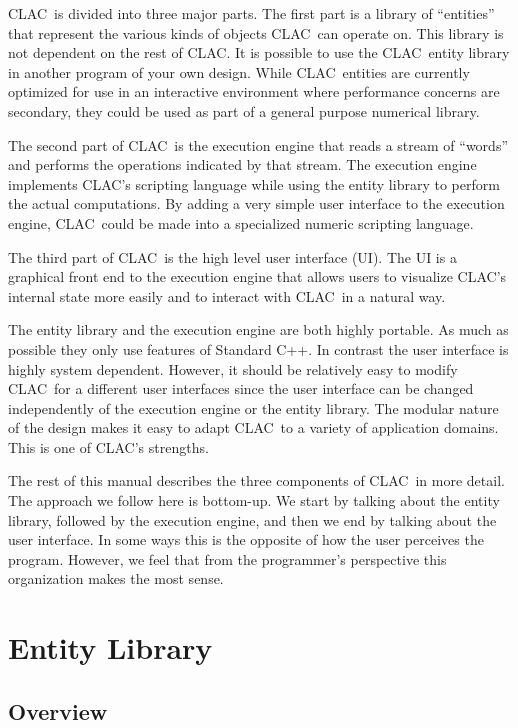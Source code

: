 \documentclass{report}
\newcommand{\CLAC}{CLAC}
\begin{document}
\CLAC\ is divided into three major parts. The first part is a library of ``entities'' that represent the various kinds of objects \CLAC\ can operate on. This library is not dependent on the rest of \CLAC. It is possible to use the \CLAC\ entity library in another program of your own design. While \CLAC\ entities are currently optimized for use in an interactive environment where performance concerns are secondary, they could be used as part of a general purpose numerical library.

The second part of \CLAC\ is the execution engine that reads a stream of ``words'' and performs the operations indicated by that stream. The execution engine implements \CLAC's scripting language while using the entity library to perform the actual computations. By adding a very simple user interface to the execution engine, \CLAC\ could be made into a specialized numeric scripting language.

The third part of \CLAC\ is the high level user interface (UI). The UI is a graphical front end to the execution engine that allows users to visualize \CLAC's internal state more easily and to interact with \CLAC\ in a natural way.

The entity library and the execution engine are both highly portable. As much as possible they only use features of Standard C++. In contrast the user interface is highly system dependent. However, it should be relatively easy to modify \CLAC\ for a different user interfaces since the user interface can be changed independently of the execution engine or the entity library. The modular nature of the design makes it easy to adapt \CLAC\ to a variety of application domains. This is one of \CLAC's strengths.

The rest of this manual describes the three components of \CLAC\ in more detail. The approach we follow here is bottom-up. We start by talking about the entity library, followed by the execution engine, and then we end by talking about the user interface. In some ways this is the opposite of how the user perceives the program. However, we feel that from the programmer's perspective this organization makes the most sense.

\chapter{Entity Library}

\section{Overview}
\end{document}
